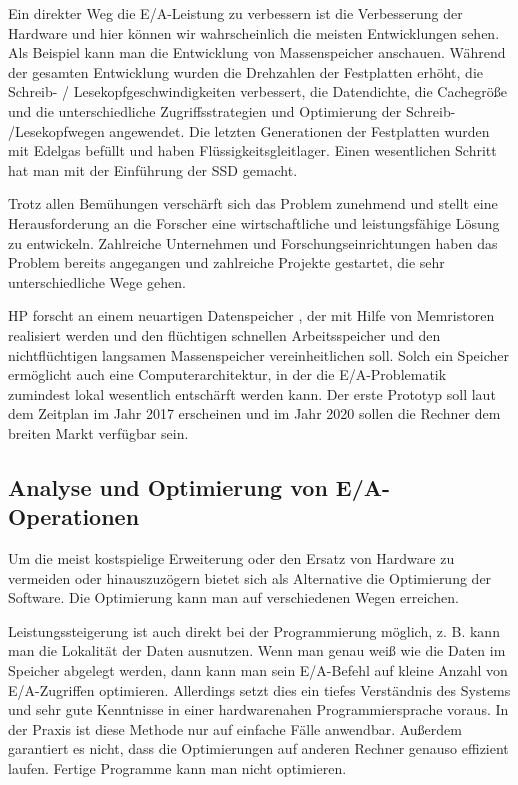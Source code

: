 Ein direkter Weg die E/A-Leistung zu verbessern ist die Verbesserung der Hardware und hier können wir wahrscheinlich die meisten Entwicklungen sehen. 
Als Beispiel kann man die Entwicklung von Massenspeicher anschauen. 
Während der gesamten Entwicklung wurden die Drehzahlen der Festplatten erhöht, die Schreib- / Lesekopfgeschwindigkeiten verbessert, die Datendichte, die Cachegröße und die unterschiedliche Zugriffsstrategien und Optimierung der Schreib- /Lesekopfwegen angewendet. 
Die letzten Generationen der Festplatten wurden mit Edelgas befüllt und haben Flüssigkeitsgleitlager. 
Einen wesentlichen Schritt hat man mit der Einführung der SSD gemacht. 


Trotz allen Bemühungen verschärft sich das Problem zunehmend und stellt eine Herausforderung an die Forscher eine wirtschaftliche und leistungsfähige Lösung zu entwickeln. 
Zahlreiche Unternehmen und Forschungseinrichtungen haben das Problem bereits angegangen und zahlreiche Projekte gestartet, die sehr unterschiedliche Wege gehen.

HP forscht an einem neuartigen Datenspeicher \cite{hp_memristor_future}, der mit Hilfe von Memristoren realisiert werden und den flüchtigen schnellen Arbeitsspeicher und den nichtflüchtigen langsamen Massenspeicher vereinheitlichen soll. 
Solch ein Speicher ermöglicht auch eine Computerarchitektur, in der die E/A-Problematik zumindest lokal wesentlich entschärft werden kann. 
Der erste Prototyp soll laut dem Zeitplan im Jahr 2017 erscheinen und im Jahr 2020 sollen die Rechner dem breiten Markt verfügbar sein. 


\subsection{Analyse und Optimierung von E/A-Operationen}
Um die meist kostspielige Erweiterung oder den Ersatz von Hardware zu vermeiden oder hinauszuzögern bietet sich als Alternative die Optimierung der Software.
Die Optimierung kann man auf verschiedenen Wegen erreichen. 

Leistungssteigerung ist auch direkt bei der Programmierung möglich, z. B. kann man die Lokalität der Daten ausnutzen. 
Wenn man genau weiß wie die Daten im Speicher abgelegt werden, dann kann man sein E/A-Befehl auf kleine Anzahl von E/A-Zugriffen optimieren. 
Allerdings setzt dies ein tiefes Verständnis des Systems und sehr gute Kenntnisse in einer hardwarenahen Programmiersprache voraus. 
In der Praxis ist diese Methode nur auf einfache Fälle anwendbar. 
Außerdem garantiert es nicht, dass die Optimierungen auf anderen Rechner genauso effizient laufen. 
Fertige Programme kann man nicht optimieren.

